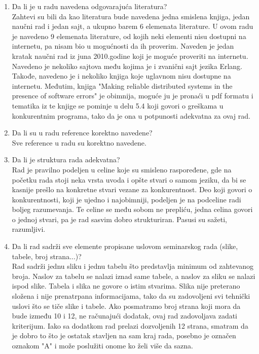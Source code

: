 \documentclass[a4paper]{report}
\begin{document}
\begin{enumerate}
\item Da li je u radu navedena odgovarajuća literatura?\\
Zahtevi su bili da kao literatura bude navedena jedna smislena knjiga, jedan naučni rad i jedan sajt, a ukupno barem 6 elemenata literature. U ovom radu je navedeno 9 elemenata literature, od kojih neki elementi nisu dostupni na internetu, pa nisam bio u mogućnosti da ih proverim. Naveden je jedan kratak naučni rad iz juna 2010.godine koji je moguće proveriti na internetu. Navedeno je nekoliko sajtova među kojima je i zvanični sajt jezika Erlang. Takođe, navedeno je i nekoliko knjiga koje uglavnom nisu dostupne na internetu. Međutim, knjiga "Making reliable distributed systems in the presence of software errors" je obimnija, moguće ju je pronaći u pdf formatu i tematika iz te knjige se pominje u delu 5.4 koji govori o greškama u konkurentnim programa, tako da je ona u potpunosti adekvatna za ovaj rad.


\item Da li su u radu reference korektno navedene?\\
Sve reference u radu su korektno navedene. 


\item Da li je struktura rada adekvatna?\\
Rad je pravilno podeljen u celine koje su smisleno raspoređene, gde na početku rada stoji neka vrsta uvoda i opšte stvari o samom jeziku, da bi se kasnije prešlo na konkretne stvari vezane za konkurentnost. Deo koji govori o konkurentnosti, koji je ujedno i najobimniji, podeljen je na podceline radi boljeg razumevanja. Te celine se među sobom ne prepliću, jedna celina govori o jednoj stvari, pa je rad sasvim dobro strukturiran. Pasusi su sažeti, razumljivi. 


\item Da li rad sadrži sve elemente propisane uslovom seminarskog rada (slike, tabele, broj strana...)?\\
Rad sadrži jednu sliku i jednu tabelu što predstavlja minimum od zahtevanog broja. Naslov za tabelu se nalazi iznad same tabele, a naslov za sliku se nalazi ispod slike. Tabela i slika ne govore o istim stvarima. Slika nije preterano složena i nije prenatrpana informacijama, tako da su zadovoljeni svi tehnički uslovi što se tiče slike i tabele. Ako posmatramo broj strana koji mora da bude između 10 i 12, ne računajući dodatak, ovaj rad zadovoljava zadati kriterijum. Iako sa dodatkom rad prelazi dozvoljenih 12 strana, smatram da je dobro to što je ostatak stavljen na sam kraj rada, posebno je označen oznakom "A" i može poslužiti onome ko želi više da sazna.



\end{enumerate}
\end{document}

